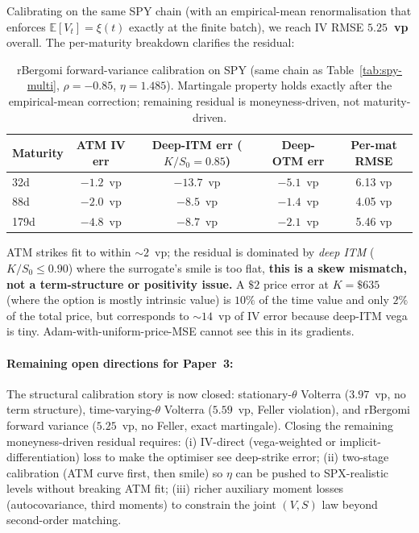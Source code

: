 \documentclass[11pt,a4paper]{article}
\begin{document}
Calibrating on the same SPY chain (with an empirical-mean renormalisation
that enforces $\mathbb{E}[V_t] = \xi(t)$ exactly at the finite batch),
we reach IV RMSE \textbf{$5.25$~vp} overall. The per-maturity breakdown
clarifies the residual:
\begin{table}[h]
\centering
\caption{rBergomi forward-variance calibration on SPY (same chain as
Table~\ref{tab:spy-multi}, $\rho=-0.85$, $\eta = 1.485$). Martingale
property holds exactly after the empirical-mean correction; remaining
residual is moneyness-driven, not maturity-driven.}
\label{tab:spy-rbergomi}
\begin{tabular}{lcccc}
\toprule
Maturity & ATM IV err & Deep-ITM err ($K/S_0 = 0.85$) & Deep-OTM err & Per-mat RMSE \\
\midrule
32d & $-1.2$~vp & $-13.7$~vp & $-5.1$~vp & 6.13 vp \\
88d & $-2.0$~vp & $-8.5$~vp & $-1.4$~vp & 4.05 vp \\
179d & $-4.8$~vp & $-8.7$~vp & $-2.1$~vp & 5.46 vp \\
\bottomrule
\end{tabular}
\end{table}

ATM strikes fit to within $\sim\!2$~vp; the residual is dominated by
\emph{deep ITM} ($K/S_0 \leq 0.90$) where the surrogate's smile is too
flat, \textbf{this is a skew mismatch, not a term-structure or
positivity issue.} A $\$2$ price error at $K=\$635$ (where the option
is mostly intrinsic value) is $10\%$ of the time value and only $2\%$
of the total price, but corresponds to $\sim\!14$~vp of IV error
because deep-ITM vega is tiny. Adam-with-uniform-price-MSE cannot see
this in its gradients.

\paragraph{Remaining open directions for Paper~3:}
The structural calibration story is now closed: stationary-$\theta$
Volterra ($3.97$~vp, no term structure), time-varying-$\theta$
Volterra ($5.59$~vp, Feller violation), and rBergomi forward variance
($5.25$~vp, no Feller, exact martingale). Closing the remaining
moneyness-driven residual requires:
(i) IV-direct (vega-weighted or implicit-differentiation) loss to make
the optimiser see deep-strike error;
(ii) two-stage calibration (ATM curve first, then smile) so $\eta$ can
be pushed to SPX-realistic levels without breaking ATM fit;
(iii) richer auxiliary moment losses (autocovariance, third moments) to
constrain the joint $(V, S)$ law beyond second-order matching.
\end{document}
